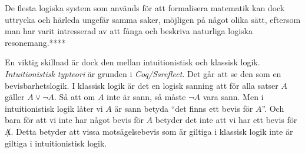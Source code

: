 De flesta logiska system som används för att formalisera matematik kan dock
uttrycka och härleda ungefär samma saker, möjligen på något olika sätt,
eftersom man har varit intresserad av att fånga och beskriva naturliga logiska
resonemang.****

En viktig skillnad är dock den mellan intuitionistisk och klassisk logik.
\emph{Intuitionistisk typteori}\cite{martin1984intuitionistic} är grunden i
\emph{Coq/Ssreflect}\cite{bertot2004interactive}. Det går att se den som en
bevisbarhetslogik. I klassisk logik är det en logisk sanning att för alla
satser $A$ gäller $A \lor \neg A$. Så att om $A$ inte är sann, så måste
$\neg A$ vara sann. Men i intuitionistisk logik låter vi $A$ är sann betyda
``det finns ett bevis för $A$''. Och bara för att vi inte har något bevis för
$A$ betyder det inte att vi har ett bevis för $\not A$. Detta betyder att vissa
motsägelsebevis som är giltiga i klassisk logik inte är giltiga i
intuitionistisk logik. \cite{proofdependent}
